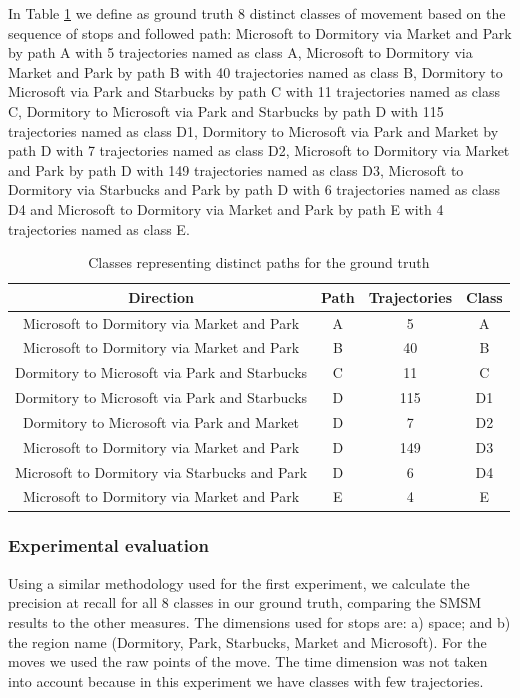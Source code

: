 \documentclass[12pt]{article}
\begin{document}
In Table \ref{tab:geolife_dataset} we define as ground truth 8 distinct classes of movement based on the sequence of stops and followed path: Microsoft to Dormitory via Market and Park by path A with 5 trajectories named as class A, Microsoft to Dormitory via Market and Park by path B with 40 trajectories named as class B, Dormitory to Microsoft via Park and Starbucks by path C with 11 trajectories named as class C, Dormitory to Microsoft via Park and Starbucks by path D with 115 trajectories named as class D1, Dormitory to Microsoft via Park and Market by path D with 7 trajectories named as class D2, Microsoft to Dormitory via Market and Park by path D with 149 trajectories named as class D3, Microsoft to Dormitory via Starbucks and Park by path D with 6 trajectories named as class D4 and Microsoft to Dormitory via Market and Park by path E with 4 trajectories named as class E.

\begin{table}[ht!]
\scriptsize
  \centering
  \begin{tabular}{|c|c|c|c|}
  	\hline
 Direction & Path &  Trajectories & Class \\
  	\hline
Microsoft to Dormitory via Market and Park& A & 5 & A \\
Microsoft to Dormitory via Market and Park& B & 40&B \\
Dormitory to Microsoft via Park and Starbucks& C & 11&C \\
Dormitory to Microsoft via Park and Starbucks& D & 115&D1 \\
Dormitory to Microsoft via Park and Market& D & 7&D2 \\
Microsoft to Dormitory via Market and Park& D & 149&D3 \\
Microsoft to Dormitory via Starbucks and Park& D & 6&D4 \\
Microsoft to Dormitory via Market and Park& E & 4& E \\
    \hline
  \end{tabular}
  \caption{Classes representing distinct paths for the ground truth}
  \label{tab:geolife_dataset}
\end{table}

\subsubsection{Experimental evaluation}

Using a similar methodology used for the first experiment, we calculate the precision at recall for all 8 classes in our ground truth, comparing the SMSM results to the other measures. The dimensions used for stops are: a) space; and b) the region name (Dormitory, Park, Starbucks, Market and Microsoft). For the moves we used the raw points of the move. The time dimension was not taken into account because in this experiment we have classes with few trajectories.
\end{document}

